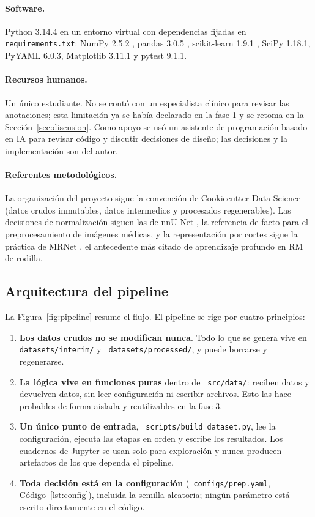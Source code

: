 \documentclass[12pt,letterpaper]{article}
\newcommand{\code}[1]{\texttt{\hyphenchar\font=-1 #1}}
\begin{document}
\paragraph{Software.} Python 3.14.4 en un entorno virtual con dependencias fijadas en \code{requirements.txt}: NumPy 2.5.2 \cite{harris2020numpy}, pandas 3.0.5 \cite{mckinney2010pandas}, scikit-learn 1.9.1 \cite{pedregosa2011sklearn}, SciPy 1.18.1, PyYAML 6.0.3, Matplotlib 3.11.1 y pytest 9.1.1.

\paragraph{Recursos humanos.} Un único estudiante. No se contó con un especialista clínico para revisar las anotaciones; esta limitación ya se había declarado en la fase 1 y se retoma en la Sección~\ref{sec:discusion}. Como apoyo se usó un asistente de programación basado en IA para revisar código y discutir decisiones de diseño; las decisiones y la implementación son del autor.

\paragraph{Referentes metodológicos.} La organización del proyecto sigue la convención de Cookiecutter Data Science \cite{cookiecutter_ds} (datos crudos inmutables, datos intermedios y procesados regenerables). Las decisiones de normalización siguen las de nnU-Net \cite{isensee2021nnunet}, la referencia de facto para el preprocesamiento de imágenes médicas, y la representación por cortes sigue la práctica de MRNet \cite{bien2018mrnet}, el antecedente más citado de aprendizaje profundo en RM de rodilla.

\subsection{Arquitectura del pipeline}

La Figura~\ref{fig:pipeline} resume el flujo. El pipeline se rige por cuatro principios:

\begin{enumerate}[leftmargin=*]
  \item \textbf{Los datos crudos no se modifican nunca}. Todo lo que se genera vive en \code{datasets/interim/} y \code{datasets/processed/}, y puede borrarse y regenerarse.
  \item \textbf{La lógica vive en funciones puras} dentro de \code{src/data/}: reciben datos y devuelven datos, sin leer configuración ni escribir archivos. Esto las hace probables de forma aislada y reutilizables en la fase 3.
  \item \textbf{Un único punto de entrada}, \code{scripts/build\_dataset.py}, lee la configuración, ejecuta las etapas en orden y escribe los resultados. Los cuadernos de Jupyter se usan solo para exploración y nunca producen artefactos de los que dependa el pipeline.
  \item \textbf{Toda decisión está en la configuración} (\code{configs/prep.yaml}, Código~\ref{lst:config}), incluida la semilla aleatoria; ningún parámetro está escrito directamente en el código.
\end{enumerate}
\end{document}
